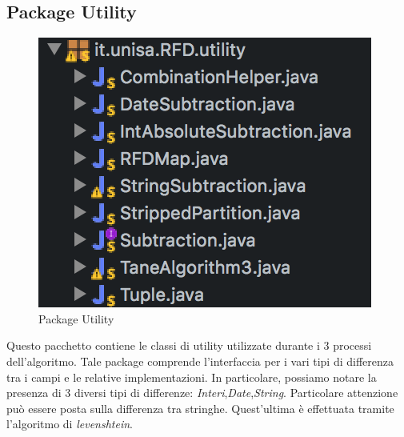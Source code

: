 \subsection{Package Utility}
\begin{figure}[H]
	\centering
	\includegraphics{Immagini/PackageUtility.png}
	\caption{Package Utility}
	\label{fig:Package Utility}
\end{figure}
Questo pacchetto contiene le classi di utility utilizzate durante i 3 processi dell'algoritmo.
Tale package comprende l'interfaccia per i vari tipi di differenza tra i campi e le relative implementazioni.
In particolare, possiamo notare la presenza di 3 diversi tipi di differenze: \emph{Interi},\emph{Date},\emph{String}. Particolare attenzione può essere posta sulla differenza tra stringhe. Quest'ultima è effettuata tramite l'algoritmo di \emph{levenshtein}.
